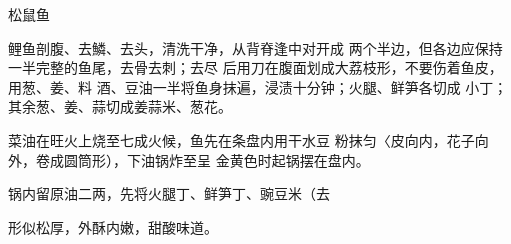 \begin{recipe}{松鼠鱼}

\ingredients


\cooking

\step 鲤鱼剖腹、去鱗、去头，清洗干净，从背脊逢中对开成 两个半边，但各边应保持一半完整的鱼尾，去骨去刺；去尽 后用刀在腹面划成大荔枝形，不要伤着鱼皮，用葱、姜、料 酒、豆油一半将鱼身抹遍，浸渍十分钟；火腿、鲜笋各切成 小丁；其余葱、姜、蒜切成姜蒜米、葱花。

\step 菜油在旺火上烧至七成火候，鱼先在条盘内用干水豆 粉抹匀〈皮向内，花子向外，卷成圆筒形），下油锅炸至呈 金黄色时起锅摆在盘内。

\step 锅内留原油二两，先将火腿丁、鲜笋丁、豌豆米（去

\notes

形似松厚，外酥内嫩，甜酸味道。

\end{recipe}

